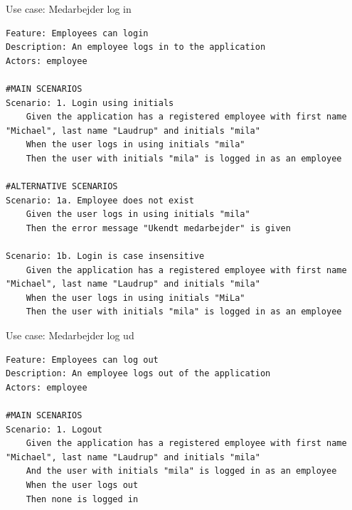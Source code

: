\begin{listing}[H]
    \centering
    \caption{Use case: Medarbejder log in}\label{lst:usecase_login}
    \begin{verbatim}  
Feature: Employees can login
Description: An employee logs in to the application
Actors: employee
        
#MAIN SCENARIOS
Scenario: 1. Login using initials
    Given the application has a registered employee with first name "Michael", last name "Laudrup" and initials "mila"
    When the user logs in using initials "mila" 
    Then the user with initials "mila" is logged in as an employee
        
#ALTERNATIVE SCENARIOS
Scenario: 1a. Employee does not exist
    Given the user logs in using initials "mila" 
    Then the error message "Ukendt medarbejder" is given
        
Scenario: 1b. Login is case insensitive
    Given the application has a registered employee with first name "Michael", last name "Laudrup" and initials "mila"
    When the user logs in using initials "MiLa" 
    Then the user with initials "mila" is logged in as an employee
    \end{verbatim}
\end{listing}
\begin{listing}[H]
    \centering
    \caption{Use case: Medarbejder log ud}\label{lst:usecase_logout}
    \begin{verbatim}  
Feature: Employees can log out
Description: An employee logs out of the application
Actors: employee

#MAIN SCENARIOS
Scenario: 1. Logout
    Given the application has a registered employee with first name "Michael", last name "Laudrup" and initials "mila"
    And the user with initials "mila" is logged in as an employee
    When the user logs out
    Then none is logged in
    \end{verbatim}
\end{listing}
